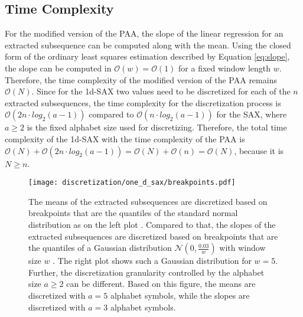 \subsection*{Time Complexity}
For the modified version of the \ac{PAA}, the slope of the linear regression for an extracted subsequence can be computed along with the mean. Using the closed form of the ordinary least squares estimation described by Equation \ref{eq:slope}, the slope can be computed in $\mathcal{O}(w) = \mathcal{O}(1)$ for a fixed window length $w$. Therefore, the time complexity of the modified version of the \ac{PAA} remains $\mathcal{O}(N)$. \newline
Since for the \ac{1d-SAX} two values need to be discretized for each of the $n$ extracted subsequences, the time complexity for the discretization process is $\mathcal{O}(2n \cdot log_{2}(a-1))$ compared to $\mathcal{O}(n \cdot log_{2}(a-1))$ for the \ac{SAX}, where $a \geq 2$ is the fixed alphabet size used for discretizing. \newline
Therefore, the total time complexity of the \ac{1d-SAX} with the time complexity of the \ac{PAA} is $\mathcal{O}(N) + \mathcal{O}(2n \cdot log_{2}(a-1)) = \mathcal{O}(N) + \mathcal{O}(n) = \mathcal{O}(N)$, because it is $N \geq n$.
\newpage
\begin{figure}[htb]
\centering
\texttt{[image: discretization/one\_d\_sax/breakpoints.pdf]}
\caption[1d-Symbolic Aggregate Approximation - Breakpoints]{The means of the extracted subsequences are discretized based on breakpoints that are the quantiles of the standard normal distribution as on the left plot \cite{1d-SAX}. Compared to that, the slopes of the extracted subsequences are discretized based on breakpoints that are the quantiles of a Gaussian distribution $\mathcal{N}(0,\frac{0.03}{w})$ with window size $w$ \cite{1d-SAX}. The right plot shows such a Gaussian distribution for $w = 5$. Further, the discretization granularity controlled by the alphabet size $a \geq 2$ can be different. Based on this figure, the means are discretized with $a = 5$ alphabet symbols, while the slopes are discretized with $a = 3$ alphabet symbols.}
\label{fig:1d-SAX_Breakpoints}
\end{figure}
